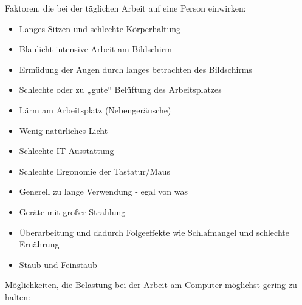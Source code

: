 \documentclass[10pt]{article}
\begin{document}
\begin{flushleft}
Faktoren, die bei der täglichen Arbeit auf eine Person einwirken:
\begin{itemize}
    \item Langes Sitzen und schlechte Körperhaltung
    \item Blaulicht intensive Arbeit am Bildschirm
    \item Ermüdung der Augen durch langes betrachten des Bildschirms
    \item Schlechte oder zu „gute“ Belüftung des Arbeitsplatzes
    \item Lärm am Arbeitsplatz (Nebengeräusche)
    \item Wenig natürliches Licht
    \item Schlechte IT-Ausstattung
    \item Schlechte Ergonomie der Tastatur/Maus
    \item Generell zu lange Verwendung - egal von was
    \item Geräte mit großer Strahlung
    \item Überarbeitung und dadurch Folgeeffekte wie Schlafmangel und schlechte Ernährung
    \item Staub und Feinstaub
\end{itemize}


Möglichkeiten, die Belastung bei der Arbeit am Computer möglichst gering zu halten:


\end{flushleft}
\end{document}
